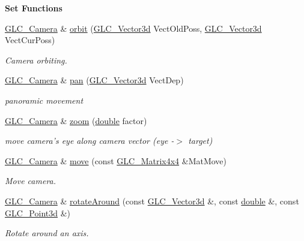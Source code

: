 \begin{Indent}{\bf Set Functions}\par
\begin{DoxyCompactItemize}
\item 
\hyperlink{class_g_l_c___camera}{G\-L\-C\-\_\-\-Camera} \& \hyperlink{class_g_l_c___camera_a9a745a22b9d9cc4c0db885b727cd06e7}{orbit} (\hyperlink{class_g_l_c___vector3d}{G\-L\-C\-\_\-\-Vector3d} Vect\-Old\-Poss, \hyperlink{class_g_l_c___vector3d}{G\-L\-C\-\_\-\-Vector3d} Vect\-Cur\-Poss)
\begin{DoxyCompactList}\small\item\em Camera orbiting. \end{DoxyCompactList}\item 
\hyperlink{class_g_l_c___camera}{G\-L\-C\-\_\-\-Camera} \& \hyperlink{class_g_l_c___camera_aa353ab78316528cb8dc01084d34306de}{pan} (\hyperlink{class_g_l_c___vector3d}{G\-L\-C\-\_\-\-Vector3d} Vect\-Dep)
\begin{DoxyCompactList}\small\item\em panoramic movement \end{DoxyCompactList}\item 
\hyperlink{class_g_l_c___camera}{G\-L\-C\-\_\-\-Camera} \& \hyperlink{class_g_l_c___camera_a59f25aa7fa65e5783e2d13dd8dc2106b}{zoom} (\hyperlink{_super_l_u_support_8h_a8956b2b9f49bf918deed98379d159ca7}{double} factor)
\begin{DoxyCompactList}\small\item\em move camera's eye along camera vector (eye -\/$>$ target) \end{DoxyCompactList}\item 
\hyperlink{class_g_l_c___camera}{G\-L\-C\-\_\-\-Camera} \& \hyperlink{class_g_l_c___camera_ab9db83af7f303c6504841fac78d9be6e}{move} (const \hyperlink{class_g_l_c___matrix4x4}{G\-L\-C\-\_\-\-Matrix4x4} \&Mat\-Move)
\begin{DoxyCompactList}\small\item\em Move camera. \end{DoxyCompactList}\item 
\hyperlink{class_g_l_c___camera}{G\-L\-C\-\_\-\-Camera} \& \hyperlink{class_g_l_c___camera_abd344faeea868ebc48f93be3196d2665}{rotate\-Around} (const \hyperlink{class_g_l_c___vector3d}{G\-L\-C\-\_\-\-Vector3d} \&, const \hyperlink{_super_l_u_support_8h_a8956b2b9f49bf918deed98379d159ca7}{double} \&, const \hyperlink{glc__vector3d_8h_a4e13a9bbc7ab3d34de7e98b41836772c}{G\-L\-C\-\_\-\-Point3d} \&)
\begin{DoxyCompactList}\small\item\em Rotate around an axis. \end{DoxyCompactList}\item 

\end{DoxyCompactItemize}
\end{Indent}

